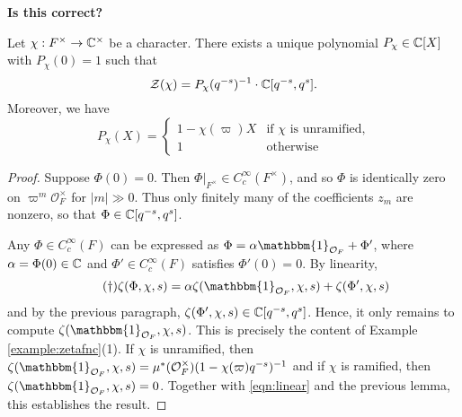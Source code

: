 \textbf{Is this correct?}
\fi

\begin{prop}\label{prop:gl1factor}
    Let $\chi:F^\times \to \mathbb{C}^\times$ be a character. There exists a unique polynomial $P_\chi \in \mathbb{C}[X]$ with $P_\chi(0)=1$ such that
    $$\mathcal Z(\chi) = P_\chi(q^{-s})^{-1}\cdot \mathbb{C}[q^{-s},q^s].$$
    Moreover, we have
    $$
    P_\chi(X) =
    \begin{cases}
        1-\chi(\varpi)X & \text{if $\chi$ is unramified,} \\
        1 & \text{otherwise}
    \end{cases}
    $$
\end{prop}
\begin{proof}
    Suppose $\Phi(0)=0$. Then $\Phi|_{F^\times} \in C_c^\infty(F^\times)$, and so $\Phi$ is identically zero on $\varpi^m\mathcal O_F^\times$ for $|m| \gg0$. Thus only finitely many of the coefficients $z_m$ are nonzero, so that $\Phi \in \mathbb{C}[q^{-s},q^s]$. 

    Any $\Phi\in C_c^\infty(F)$ can be expressed as $\Phi=\alpha\mathbbm{1}_{\mathcal{O}_F}+\Phi'$, where $\alpha=\Phi(0)\in\mathbb{C}$ and $\Phi'\in C_c^\infty(F)$ satisfies $\Phi'(0)=0$. By linearity,
    \begin{equation}\tag{\dag}\label{eqn:linear}
        \zeta(\Phi,\chi,s)=\alpha\zeta(\mathbbm{1}_{\mathcal{O}_F},\chi,s)+\zeta(\Phi',\chi,s)
    \end{equation}
    and by the previous paragraph, $\zeta(\Phi',\chi,s)\in\mathbb{C}[q^{-s},q^{s}]$. Hence, it only remains to compute $\zeta(\mathbbm{1}_{\mathcal O_F},\chi,s)$. This is precisely the content of Example \ref{example:zetafnc}(1). If $\chi$ is unramified, then $\zeta(\mathbbm{1}_{\mathcal O_F},\chi,s)=\mu^*(\mathcal{O}_F^\times)(1-\chi(\varpi)q^{-s})^{-1}$ and if $\chi$ is ramified, then $\zeta(\mathbbm{1}_{\mathcal O_F},\chi,s)=0$. Together with \eqref{eqn:linear} and the previous lemma, this establishes the result. 
\end{proof}

\iffalse
\begin{rem}
    The computation in the proof above shows, in the case $\chi = 1$, that $\zeta(\mathbbm{1}_{\cO_F},1,s) = (1-q^{-s})^{-1}$, provided that $\mu^*(\mathcal{O}_F^\times)=1$. If $F=K_v$ is the completion of a number field $K$ at a non-Archimedean place $v$, we recover the Euler factor of the Dedekind zeta function $\zeta_K(s)$ at the place $v$. This explains the naming of our zeta functions. 
\end{rem}
\fi

